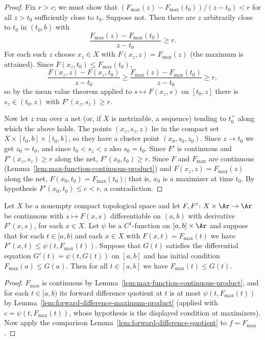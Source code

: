 \begin{proof}
\leanok
{}
Fix $r>c$; we must show that
$(F_{\mathrm{max}}(z)-F_{\mathrm{max}}(t_0))/(z-t_0)<r$ for all
$z>t_0$ sufficiently close to $t_0$. Suppose not. Then there are
$z$ arbitrarily close to $t_0$ in $(t_0,b)$ with
$$\frac{F_{\mathrm{max}}(z)-F_{\mathrm{max}}(t_0)}{z-t_0}\ge r.$$
For each such $z$ choose $x_z\in X$ with
$F(x_z,z)=F_{\mathrm{max}}(z)$ (the maximum is attained). Since
$F(x_z,t_0)\le F_{\mathrm{max}}(t_0)$,
$$\frac{F(x_z,z)-F(x_z,t_0)}{z-t_0}\ge
\frac{F_{\mathrm{max}}(z)-F_{\mathrm{max}}(t_0)}{z-t_0}\ge r,$$
so by the mean value theorem applied to $s\mapsto F(x_z,s)$ on
$[t_0,z]$ there is $s_z\in(t_0,z)$ with $F'(x_z,s_z)\ge r$.

Now let $z$ run over a net (or, if $X$ is metrizable, a sequence)
tending to $t_0^+$ along which the above holds. The points
$(x_z,s_z,z)$ lie in the compact set $X\times[t_0,b]\times[t_0,b]$,
so they have a cluster point $(x_0,s_0,z_0)$. Since $z\rightarrow
t_0$ we get $z_0=t_0$, and since $t_0<s_z<z$ also $s_0=t_0$. Since
$F'$ is continuous and $F'(x_z,s_z)\ge r$ along the net,
$F'(x_0,t_0)\ge r$. Since $F$ and $F_{\mathrm{max}}$ are continuous
(Lemma~\ref{lem:max-function-continuous-product}) and
$F(x_z,z)=F_{\mathrm{max}}(z)$ along the net,
$F(x_0,t_0)=F_{\mathrm{max}}(t_0)$; that is, $x_0$ is a maximizer at
time $t_0$. By hypothesis $F'(x_0,t_0)\le c<r$, a contradiction.
\end{proof}

\begin{corollary}
\label{cor:forward-difference-maximum-product}
\leanok
{}
Let $X$ be a nonempty compact topological space and let $F,F'\colon
X\times\Ar\to\Ar$ be continuous with $s\mapsto F(x,s)$ differentiable
on $(a,b)$ with derivative $F'(x,s)$, for each $x\in X$. Let $\psi$
be a $C^1$-function on $[a,b]\times\Ar$ and suppose that for each
$t\in[a,b)$ and each $x\in X$ with $F(x,t)=F_{\mathrm{max}}(t)$ we
have $F'(x,t)\le\psi(t,F_{\mathrm{max}}(t))$. Suppose that $G(t)$
satisfies the differential equation $G'(t)=\psi(t,G(t))$ on $[a,b]$
and has initial condition $F_{\mathrm{max}}(a)\le G(a)$. Then for all
$t\in [a,b]$ we have $F_{\mathrm{max}}(t)\le G(t)$.
\end{corollary}

\begin{proof}
\leanok
{}
$F_{\mathrm{max}}$ is continuous by
Lemma~\ref{lem:max-function-continuous-product}, and for each
$t\in[a,b)$ its forward difference quotient at $t$ is at most
$\psi(t,F_{\mathrm{max}}(t))$ by
Lemma~\ref{lem:forward-difference-maximum-product} (applied with
$c=\psi(t,F_{\mathrm{max}}(t))$, whose hypothesis is the displayed
condition at maximizers). Now apply the comparison
Lemma~\ref{lem:forward-difference-quotient} to $f=F_{\mathrm{max}}$.
\end{proof}

